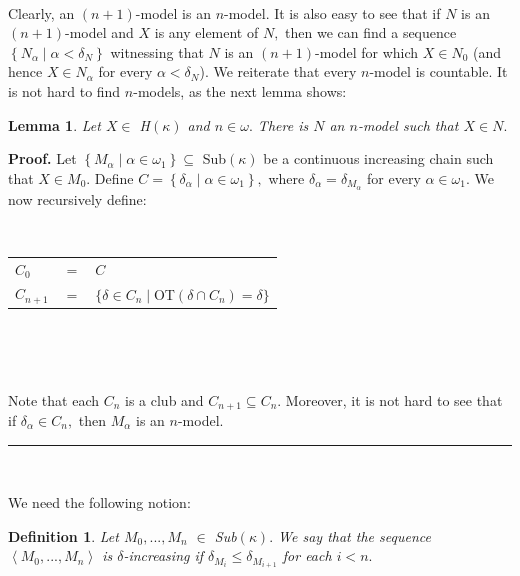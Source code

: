 \documentclass{article}%
\newtheorem{definition}[theorem]{Definition}
\newtheorem{lemma}[theorem]{Lemma}
\newenvironment{proof}[1][Proof]{\noindent\textbf{#1.} }{\ \rule{0.5em}{0.5em}}
\begin{document}
\qquad\qquad\ \ 

Clearly, an $\left(  n+1\right)  $-model is an $n$-model. It is also easy to
see that if $N$ is an $\left(  n+1\right)  $-model and $X$ is any element of
$N,$ then we can find a sequence $\left\{  N_{\alpha}\mid\alpha<\delta
_{N}\right\}  $ witnessing that $N$ is an $\left(  n+1\right)  $-model for
which $X\in N_{0}$ (and hence $X\in N_{\alpha}$ for every $\alpha<\delta_{N}%
$). We reiterate that every $n$-model is countable. It is not hard to find
$n$-models, as the next lemma shows:

\begin{lemma}
Let $X\in$ \textsf{H}$\left(  \kappa\right)  $ and $n\in\omega.$ There is $N$
an $n$-model such that $X\in N.$
\end{lemma}

\begin{proof}
Let $\left\{  M_{\alpha}\mid\alpha\in\omega_{1}\right\}  \subseteq$
\textsf{Sub}$\left(  \kappa\right)  $ be a continuous increasing chain such
that $X\in M_{0}$. Define $C=\left\{  \delta_{\alpha}\mid\alpha\in\omega
_{1}\right\}  ,$ where $\delta_{\alpha}=\delta_{M_{\alpha}}$ for every
$\alpha\in\omega_{1}.$ We now recursively define:

\qquad\qquad\ \ 

\hfill%
\begin{tabular}
[c]{lll}%
$C_{0}$ & $=$ & $C$\\
$C_{n+1}$ & $=$ & $\{\delta\in C_{n}\mid$\textsf{OT}$\left(  \delta\cap
C_{n}\right)  =\delta\}$%
\end{tabular}
\qquad\ \qquad\qquad\hfill

\qquad\qquad\ \ \ \ \qquad\ \ \ \medskip

Note that each $C_{n}$ is a club and $C_{n+1}\subseteq C_{n}$. Moreover, it is
not hard to see that if $\delta_{\alpha}\in C_{n},$ then $M_{\alpha}$ is an
$n$-model.
\end{proof}

\qquad\ \qquad\ \ 

We need the following notion:

\begin{definition}
Let $M_{0},...,M_{n}$ $\in$ \textsf{Sub}$\left(  \kappa\right)  .$ We say that
the sequence $\left\langle M_{0},...,M_{n}\right\rangle $ is $\delta
$\emph{-increasing }if $\delta_{M_{i}}\leq\delta_{M_{i+1}}$ for each $i<n.$
\end{definition}

\qquad\qquad\ \ \ 
\end{document}
